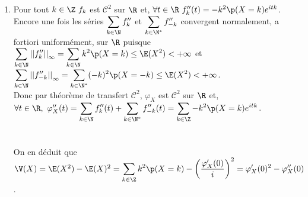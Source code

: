 \documentclass[8pt]{book}
\begin{document}
\begin{enumerate}
		On en déduit que $\E(X)=\displaystyle\frac{\varphi_X'(0)}{i}=-i\varphi_X'(0)$.
		\item Pour tout $k\in \Z\ f_k$ est $\mathcal{C}^2$ sur $\R$ et, $\forall t\in \R\ f_k''(t)=-k^2\p(X=k)e^{itk}$.\\
		Encore une fois les séries $\displaystyle\sum\limits_{k\in \N}f_k''$ et $\displaystyle\sum\limits_{k\in \N^*}f_{-k}''$ convergent normalement, a fortiori uniformément, sur $\R$ puisque $\displaystyle\sum\limits_{k\in \N}{||f_k''||}_\infty=\displaystyle\sum\limits_{k\in \N}k^2\p(X=k)\leq \E(X^2)<+\infty$ et $\displaystyle\sum\limits_{k\in \N}{||f_{-k}''||}_\infty=\displaystyle\sum\limits_{k\in \N^*}(-k)^2\p(X=-k)\leq \E(X^2)<+\infty$.\\
		Donc par théorème de transfert $\mathcal{C}^2$, $\varphi_X$ est $\mathcal{C}^2$ sur $\R$ et,\\
		$\forall t\in \R,\ \varphi_X''(t)=\displaystyle\sum\limits_{k\in \N}f_k''(t)+\displaystyle\sum\limits_{k\in \N^*}f_{-k}''(t)=\sum\limits_{k\in \Z}-k^2\p(X=k)e^{itk}$.\\\\\\
		On en déduit que $\V(X)=\E(X^2)-\E(X)^2=\displaystyle\sum\limits_{k\in \Z}k^2\p(X=k)-\left(\frac{\varphi_X'(0)}{i}\right)^2=\varphi_X'(0)^2-\varphi_X''(0)$.
	\end{enumerate}
	
\end{document}
